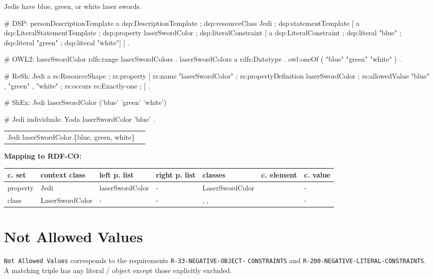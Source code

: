 \documentclass{llncs}
\newcommand{\ms}[1]{\texttt{#1}}
\newenvironment{gcotable}{
  \scriptsize
  \sffamily
  \vspace{0cm}
	\begin{center}
	\textbf{\vspace{0.4cm}Mapping to RDF-CO:} \\
  \begin{tabular}{l|l|l|l|l|l|l}
	\hline
  \textbf{c. set} & \textbf{context class} & \textbf{left p. list} & \textbf{right p. list} & \textbf{classes} & \textbf{c. element} & \textbf{c. value} \\
  \hline

}{
  \hline
  \end{tabular}
	\end{center}
}
\newenvironment{DL}{
\vspace{0cm}
	\begin{center}
  \begin{tabular}{r l}

}{
  \end{tabular}
	\end{center}
}
\begin{document}
Jedis have blue, green, or white laser swords.

\begin{ex}
# DSP:
personDescriptionTemplate
    a dsp:DescriptionTemplate ;
    dsp:resourceClass Jedi ;
    dsp:statementTemplate [
        a dsp:LiteralStatementTemplate ;
        dsp:property laserSwordColor ;
        dsp:literalConstraint [
            a dsp:LiteralConstraint ;
            dsp:literal "blue" ;
            dsp:literal "green" ;
            dsp:literal "white"] ] .
\end{ex}

\begin{ex}
# OWL2:
laserSwordColor rdfs:range laserSwordColors . 
laserSwordColors
    a rdfs:Datatype .
    owl:oneOf ( "blue" "green" "white" ) .
\end{ex}

\begin{ex}
# ReSh:
Jedi a rs:ResourceShape ;
    rs:property [
        rs:name "laserSwordColor" ;
        rs:propertyDefinition laserSwordColor ;
        rs:allowedValue "blue" , "green" , "white" ;
        rs:occurs rs:Exactly-one ; ] .
\end{ex}

\begin{ex}
# ShEx:
Jedi {
    laserSwordColor ('blue' 'green' 'white') }
\end{ex}

\begin{ex}
# Jedi individuals:
Yoda 
    laserSwordColor 'blue' .
\end{ex}

\begin{DL}
Jedi   laserSwordColor.\{blue, green, white\} \\
\end{DL}

\begin{gcotable}
property & Jedi & laserSwordColor & - & LaserSwordColor &  & - \\
class & LaserSwordColor & - & - & , ,  &  & - \\
\end{gcotable}

\section{Not Allowed Values}

\ms{Not Allowed Values} corresponds to the requirements
\ms{R-33-NEGATIVE-OBJECT-} \ms{CONSTRAINTS} and
\ms{R-200-NEGATIVE-LITERAL-CONSTRAINTS}.
A matching triple has any literal / object except those explicitly excluded.
\end{document}
